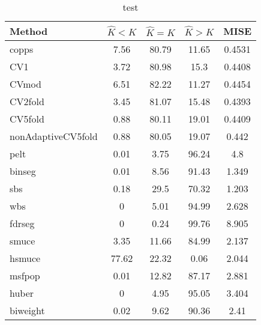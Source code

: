 \begin{table}[ht]
\centering
\begin{tabular}{l|cccc}
  \hline
Method & $\hat{K} < K$ & $\hat{K} = K$ & $\hat{K} > K$ & MISE \\ 
  \hline
copps &  7.56 & 80.79 & 11.65 & 0.4531 \\ 
  CV1 &  3.72 & 80.98 &  15.3 & 0.4408 \\ 
  CVmod &  6.51 & 82.22 & 11.27 & 0.4454 \\ 
  CV2fold &  3.45 & 81.07 & 15.48 & 0.4393 \\ 
  CV5fold &  0.88 & 80.11 & 19.01 & 0.4409 \\ 
  nonAdaptiveCV5fold &  0.88 & 80.05 & 19.07 & 0.442 \\ 
  pelt &  0.01 &  3.75 & 96.24 &   4.8 \\ 
  binseg &  0.01 &  8.56 & 91.43 & 1.349 \\ 
  sbs &  0.18 &  29.5 & 70.32 & 1.203 \\ 
  wbs &     0 &  5.01 & 94.99 & 2.628 \\ 
  fdrseg &     0 &  0.24 & 99.76 & 8.905 \\ 
  smuce &  3.35 & 11.66 & 84.99 & 2.137 \\ 
  hsmuce & 77.62 & 22.32 &  0.06 & 2.044 \\ 
  msfpop &  0.01 & 12.82 & 87.17 & 2.881 \\ 
  huber &     0 &  4.95 & 95.05 & 3.404 \\ 
  biweight &  0.02 &  9.62 & 90.36 &  2.41 \\ 
   \hline
\end{tabular}
\caption{test} 
\end{table}
